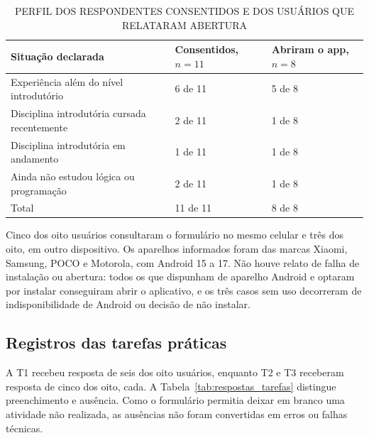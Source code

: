 \documentclass[
    12pt
    ,oneside
    ,a4paper
    ,chapter=TITLE
    ,section=TITLE
    ,sumario=abnt-6027-2012]{abntex2}
\renewcommand{\legenda}[2][]{%
    \centering
    \caption[\MakeTextUppercase{#2}]{\maybeLabel{#1}\MakeTextUppercase{#2}}%
}
\begin{document}
\begin{table}[htb]
\centering
\legenda[tab:perfil_participantes]{Perfil dos respondentes consentidos e dos usuários que relataram abertura}
\small
\begin{tabular}{P{7.0cm}P{3.1cm}P{3.1cm}}
\toprule
Situação declarada & Consentidos, $n=11$ & Abriram o app, $n=8$ \\
\midrule
Experiência além do nível introdutório & 6 de 11 & 5 de 8 \\
Disciplina introdutória cursada recentemente & 2 de 11 & 1 de 8 \\
Disciplina introdutória em andamento & 1 de 11 & 1 de 8 \\
Ainda não estudou lógica ou programação & 2 de 11 & 1 de 8 \\
Total & 11 de 11 & 8 de 8 \\
\bottomrule
\end{tabular}
\vspace{0.2cm}
\end{table}
\FloatBarrier

Cinco dos oito usuários consultaram o formulário no mesmo celular e três dos oito,
em outro dispositivo. Os aparelhos informados foram das marcas Xiaomi, Samsung, POCO e Motorola, com Android 15 a 17. Não houve relato de falha de instalação ou abertura: todos os que dispunham de aparelho Android e optaram por instalar conseguiram abrir o aplicativo, e os três casos sem uso decorreram de indisponibilidade de Android ou decisão de não instalar.

\subsection{Registros das tarefas práticas}
\label{sec:resultados_tarefas}

A T1 recebeu resposta de seis dos oito usuários, enquanto T2 e T3 receberam resposta
de cinco dos oito, cada. A Tabela~\ref{tab:respostas_tarefas} distingue preenchimento e ausência.
Como o formulário permitia deixar em branco uma atividade não realizada, as ausências
não foram convertidas em erros ou falhas técnicas.
\end{document}
